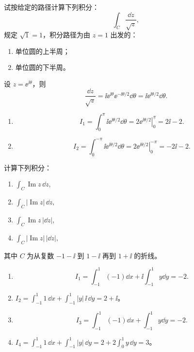 \begin{question}
试按给定的路径计算下列积分：
\[
\int_C\frac{\dd{z}}{\sqrt{z}},
\]
规定 \(\sqrt{1}=1\)，积分路径为由 \(z=1\) 出发的：
\begin{enumerate}
  \item 单位圆的上半周；
  \item 单位圆的下半周。
\end{enumerate}
\begin{solution}
设 \(z=\ee^{\ii\theta}\)，则
\[
\frac{\dd{z}}{\sqrt z}
=\ii\ee^{\ii\theta}\ee^{-\ii\theta/2}\dd{\theta}
=\ii\ee^{\ii\theta/2}\dd{\theta}.
\]

\begin{enumerate}
  \item
  \[
  I_1=\int_0^\pi\ii\ee^{\ii\theta/2}\dd{\theta}
  =\left.2\ee^{\ii\theta/2}\right|_0^\pi
  =2\ii-2.
  \]
  \item
  \[
  I_2=\int_0^{-\pi}\ii\ee^{\ii\theta/2}\dd{\theta}
  =\left.2\ee^{\ii\theta/2}\right|_0^{-\pi}
  =-2\ii-2.
  \]
\end{enumerate}
\end{solution}
\end{question}

\begin{question}
计算下列积分：
\begin{enumerate}
  \item \(\displaystyle\int_C\operatorname{Im}z\,\dd{z},\)
  \item \(\displaystyle\int_C|\operatorname{Im}z|\,\dd{z},\)
  \item \(\displaystyle\int_C\operatorname{Im}z\,|\dd{z}|,\)
  \item \(\displaystyle\int_C|\operatorname{Im}z|\,|\dd{z}|,\)
\end{enumerate}
其中 \(C\) 为从复数 \(-1-\ii\) 到 \(1-\ii\) 再到 \(1+\ii\) 的折线。

\begin{center}
\end{center}

\begin{solution}
\begin{enumerate}
  \item
  \[
  I_1=\int_{-1}^{1}(-1)\dd{x}
  +\ii\int_{-1}^{1}y\dd{y}
  =-2.
  \]
  \item \(\displaystyle I_2=\int_{-1}^{1}1\,\dd{x}+\int_{-1}^{1}|y|\,\ii\,\dd{y}=2+\ii\)。
  \item
  \[
  I_3=\int_{-1}^{1}(-1)\dd{x}
  +\int_{-1}^{1}y\dd{y}
  =-2.
  \]
    \item \(\displaystyle I_4=\int_{-1}^{1}1\,\dd{x}+\int_{-1}^{1}|y|\,\dd{y}=2+2\int_{0}^{1}y\,\dd{y}=3\)。
  \end{enumerate}
  \end{solution}
  \end{question}
